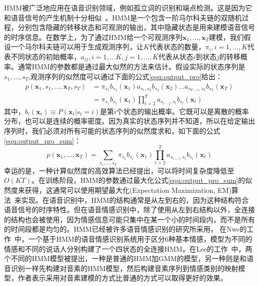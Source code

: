 HMM被广泛地应用在语音识别领域，例如孤立词的识别和端点检测。这是因为它和语音信号的产生机制十分相似~\cite{Rabiner2007An}。HMM是一个包含一阶马尔科夫链的双随机过程，分别包含隐藏的转移状态和可观测的输出，其中隐藏状态是用来建模语音信号的时序信息。在数学上，为了通过HMM给一个可观测序列$\mathbf{x}_1,...,\mathbf{x}_T$建模，我们假设一个马尔科夫链可以用于生成观测序列，让$K$代表状态的数量，$\pi_i, i=1,...,K$代表不同状态的初始概率，$a_{ij}, i=1,...K, j=1,...,K$代表从状态$i$到状态$j$的转移概率。通常HMM的参数都是通过最大似然的方法来估计。假设实际的状态序列是$s_1,...,s_T$,观测序列的似然度可以通过下面的公式\ref{equ:output_pro}给出：
\begin{equation}
\label{equ:output_pro}
    \begin{aligned}
        p(\mathbf{x}_1,s_1,...,\mathbf{x}_T,s_T) &= \pi_{s_1}b_{s_1}(\mathbf{x}_1)a_{s_1,s_2}b_{s_2}(\mathbf{x}_2)...a_{s_{T-1},s_T}b_{s_T}(\mathbf{x}_T) \\
        &= \pi_{s_1}b_{s_1}(\mathbf{x}_1)\prod\limits_{t=2}^Ta_{s_{t-1},s_t}b_{s_t}(\mathbf{x}_t)
    \end{aligned}
\end{equation}
其中，$b_i(\mathbf{x}_t) \equiv P(\mathbf{x}_t|s_t = i)$是第$i$个状态的输出概率。它既可以是离散的概率分布，也可以是连续的概率密度。因为真实的状态序列并不知道，所以在给定输出序列时，我们必须对所有可能的状态序列的似然度求和，如下面的公式\ref{equ:output_pro_sum}：
\begin{equation}
\label{equ:output_pro_sum}
        p(\mathbf{x}_1,...,\mathbf{x}_T) = \sum\limits_{s_1,...,s_T}\pi_{s_1}b_{s_1}(\mathbf{x}_1)\prod\limits_{t=2}^Ta_{s_{t-1},s_t}b_{s_t}(\mathbf{x}_t)
\end{equation}
幸运的是，一种计算似然度的高效算法已经提出，可以将时间复杂度降低至$O(KT)$。在训练阶段，HMM的参数通过最大化公式\ref{equ:output_pro_sum}的似然度来获得，这通常可以使用期望最大化(Expectation Maximization, EM)算法~\cite{Dempster1977Maximum}来实现。在语音识别中，HMM的结构通常是从左到右的，因为这种结构符合语音信号的时序特性。但在语音情感识别中，除了使用从左到右结构以外，全连接的结构也会被使用，因为情感信息可能只集中在某一个小的时间段内，而不是所有的时间段都是均匀的。HMM已经被许多语音情感识别的研究所采用， 在Nwe的工作~\cite{Nogueiras2012Speech}中，一个基于HMM的语音情感识别系统用于区分6种基本情感，模型为不同的情感和不同的说话人分别构建了一个四状态的全连接HMM。在Lee的工作~\cite{Lee2004Emotion}中，两个不同的HMM模型被提出，一种是普通的HMM加GMM的模型，另一种则是和语音识别一样先构建对音素的HMM模型，然后构建音素序列到情感类别的映射模型，作者表示采用对音素建模的方式比普通的方式可以取得更好的效果。

